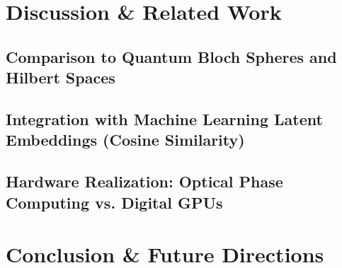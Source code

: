 \documentclass[12pt, a4paper]{article}
\begin{document}
\section{Discussion \& Related Work}
\subsection{Comparison to Quantum Bloch Spheres and Hilbert Spaces}
\subsection{Integration with Machine Learning Latent Embeddings (Cosine Similarity)}
\subsection{Hardware Realization: Optical Phase Computing vs. Digital GPUs}

\section{Conclusion \& Future Directions}
\end{document}
